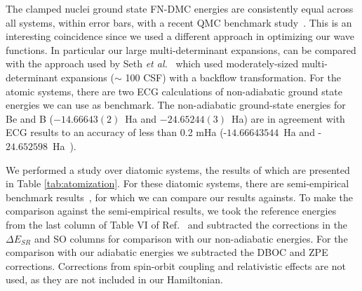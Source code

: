 \documentclass[pra,superscriptaddress,groupedaddress,twocolumn]{revtex4}
\begin{document}
The clamped nuclei ground state FN-DMC energies  are consistently equal across all systems, within error bars, with a recent QMC benchmark study~\cite{Seth_Bench}. This is an interesting coincidence since we used a different approach in optimizing our wave functions.   In particular our large multi-determinant expansions, can be compared with the approach used by Seth {\it et al.}~\cite{Seth_Bench} which used moderately-sized multi-determinant expansions ($\sim$ 100 CSF) with a backflow transformation.   %
 For the atomic systems, there are two ECG calculations of non-adiabatic ground state energies we can use as benchmark.  The non-adiabatic ground-state energies for Be and B ($-14.66643(2)$~Ha and $-24.65244(3)$~Ha) are in agreement with ECG results  to an accuracy of less than 0.2 mHa (-$14.66643544$~Ha \cite{Bubin_BeH_noBO} and -$24.652598$~Ha~\cite{Bubin_BH_noBO}).  %

We performed a study over diatomic systems, the results of which are presented in Table \ref{tab:atomization}. For these diatomic systems, there are semi-empirical benchmark results~\cite{Feller_Corrections}, for which we can compare our results againsts. %
To make the comparison against the semi-empirical results, we took the reference energies from the last column of Table VI of Ref.~\cite{Feller_Corrections} and subtracted the corrections in the $\Delta E_{SR}$ and SO columns for comparison with our non-adiabatic energies.  For the comparison with our adiabatic energies we subtracted the DBOC and ZPE corrections.  Corrections from spin-orbit coupling and relativistic effects are not used, as they are not included in our Hamiltonian.

\end{document}
